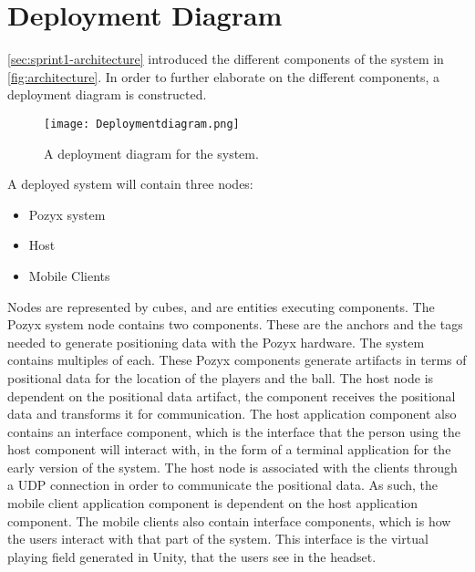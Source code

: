 \section{Deployment Diagram}\label{sec:sprint2-deploymentdia}
\autoref{sec:sprint1-architecture} introduced the different components of the system in \autoref{fig:architecture}.
In order to further elaborate on the different components, a deployment diagram is constructed.
\begin{figure}[H]
    \centering
    \texttt{[image: Deploymentdiagram.png]}
    \caption{A deployment diagram for the system.}
    \label{fig:sprint2-deployment}
\end{figure}
\noindent
A deployed system will contain three nodes:
\begin{itemize}
    \item Pozyx system
    \item Host
    \item Mobile Clients
\end{itemize}
Nodes are represented by cubes, and are entities executing components.
The Pozyx system node contains two components.
These are the anchors and the tags needed to generate positioning data with the Pozyx hardware.
The system contains multiples of each.
These Pozyx components generate artifacts in terms of positional data for the location of the players and the ball.
The host node is dependent on the positional data artifact, the component receives the positional data and transforms it for communication.
The host application component also contains an interface component, which is the interface that the person using the host component will interact with, in the form of a terminal application for the early version of the system.
The host node is associated with the clients through a UDP connection in order to communicate the positional data.
As such, the mobile client application component is dependent on the host application component.
The mobile clients also contain interface components, which is how the users interact with that part of the system.
This interface is the virtual playing field generated in Unity, that the users see in the headset.
